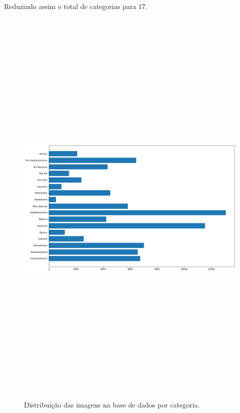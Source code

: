 \documentclass[12pt, a4paper]{article}
\begin{document}
Reduzindo assim o total de categorias para 17.
 
\begin{figure}[H]
	\centering
	\includegraphics[width=\textwidth, height=20cm, keepaspectratio=true]{fig/databalance}
	\caption{Distribuição das imagens na base de dados por categoria.}
\end{figure}
\end{document}
